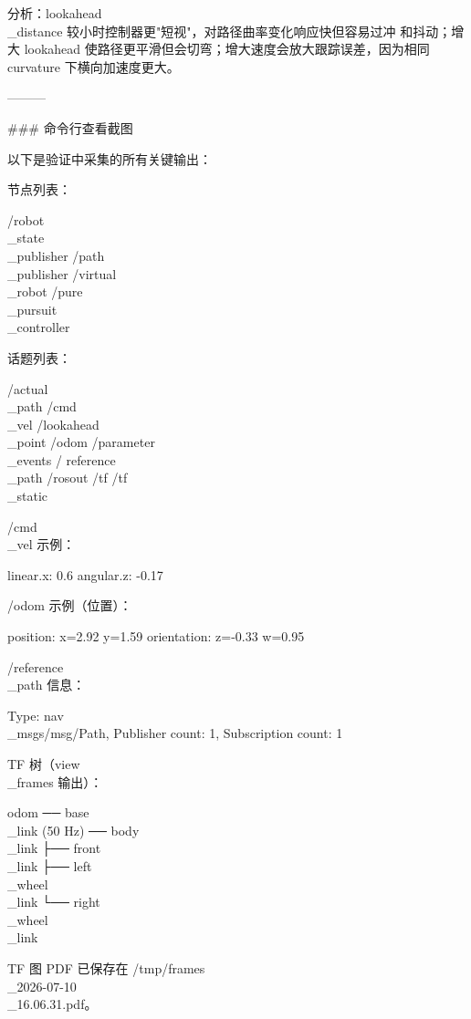 \documentclass[a4paper,12pt]{book}
\begin{document}
{  分析：lookahead\\_distance 较小时控制器更"短视"，对路径曲率变化响应快但容易过冲
  和抖动；增大 lookahead 使路径更平滑但会切弯；增大速度会放大跟踪误差，因为相同
  curvature 下横向加速度更大。

  ———

  ### 命令行查看截图

  以下是验证中采集的所有关键输出：

  节点列表：

  /robot\\_state\\_publisher
  /path\\_publisher
  /virtual\\_robot
  /pure\\_pursuit\\_controller

  话题列表：

  /actual\\_path  /cmd\\_vel  /lookahead\\_point  /odom  /parameter\\_events  /
  reference\\_path  /rosout  /tf  /tf\\_static

  /cmd\\_vel 示例：

  linear.x: 0.6  angular.z: -0.17

  /odom 示例（位置）：

  position: x=2.92  y=1.59  orientation: z=-0.33  w=0.95

  /reference\\_path 信息：

  Type: nav\\_msgs/msg/Path, Publisher count: 1, Subscription count: 1

  TF 树（view\\_frames 输出）：

  odom ── base\\_link (50 Hz) ── body\\_link
                             ├── front\\_link
                             ├── left\\_wheel\\_link
                             └── right\\_wheel\\_link

  TF 图 PDF 已保存在 /tmp/frames\\_2026-07-10\\_16.06.31.pdf。

}
\end{document}
